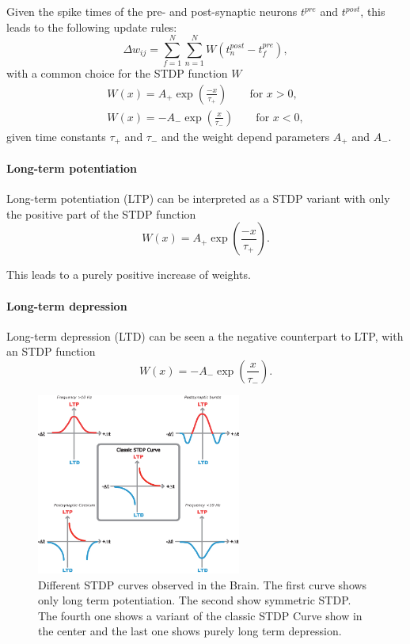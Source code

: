 Given the spike times of the pre- and post-synaptic neurons $t^{pre}$ and $t^{post}$, this leads to the following update rules:
\[
\Delta w_{ij} = \sum_{f=1}^N \sum_{n=1}^N W(t^{post}_n - t^{pre}_f),
\]
with a common choice for the STDP function $W$
\[
\begin{split}
W(x) =  A_+ \exp(\frac{-x}{\tau_+}) \quad \quad \text{for  } x > 0,  \\
W(x) = -A_- \exp(\frac{x}{\tau_-}) \quad \quad \text{for  } x < 0,
\end{split}
\]
given time constants $\tau_+$ and $\tau_-$ and the weight depend parameters $A_+$ and $A_-$.
     

\paragraph{Long-term potentiation}
 
Long-term potentiation (LTP) can be interpreted as a STDP variant with only the positive part of the STDP function
\[
W(x) =  A_+ \exp(\frac{-x}{\tau_+}).
\]

This leads to a purely positive increase of weights.

\paragraph{Long-term depression}

Long-term depression (LTD) can be seen a the negative counterpart to LTP, with an STDP function
\[
W(x) =  -A_- \exp(\frac{x}{\tau_-}).
\]

\begin{figure}
	\centering
    	\includegraphics[width=0.6\textwidth]{imgs/stdp_curves.jpg} 
    \caption{Different STDP curves observed in the Brain. The first curve shows only long term potentiation. The second show symmetric STDP. The fourth one shows a variant of the classic STDP Curve show in the center and the last one shows purely long term depression.}
	\label{fig:stdp}
\end{figure}